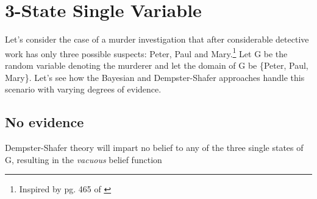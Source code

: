 \documentclass[letterpaper]{article}
\begin{document}
\section{3-State Single Variable}
Let's consider the case of a murder investigation that after considerable detective work has only three possible suspects: Peter, Paul and Mary.\footnote{Inspired by pg. 465 of \cite{Pearl1988}}  Let G be the random variable denoting the murderer and let the domain of G be \{Peter, Paul, Mary\}.  Let's see how the Bayesian and Dempster-Shafer approaches handle this scenario with varying degrees of evidence. 

\subsection{No evidence}

Dempster-Shafer theory will impart no belief to any of the three single states of G, resulting in the \textit{vacuous} belief function




\end{document}
